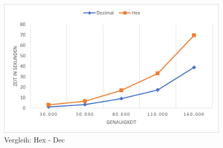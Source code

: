 \documentclass[course=erap]{aspdoc}
\begin{document}
\begin{figure}[ht]
                                                                                                                                                                                                                                                                                                                                                                                                                                                                                                                                                                                                                                                                                                                                                                                                                                                                                       \includegraphics[scale = 1.0]{Images/HexDec.png}
                                                                                                                                                                                                                                                                                                                                                                                                                                                                                                                                                                                                                                                                                                                                                                                                                                                                                       \caption{Vergleih: Hex - Dec}

\end{figure}
\end{document}
